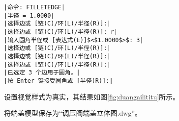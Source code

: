 \begin{procedure}
\begin{lstlisting}
|命令: FILLETEDGE|
|半径 = 1.0000|
|选择边或 [链(C)/环(L)/半径(R)]:|
|选择边或 [链(C)/环(L)/半径(R)]: r|
|输入圆角半径或 [表达式(E)]$<$1.0000$>$: 3|
|选择边或 [链(C)/环(L)/半径(R)]:|  
|选择边或 [链(C)/环(L)/半径(R)]:|
|选择边或 [链(C)/环(L)/半径(R)]:|
|已选定 3 个边用于圆角。|
|按 Enter 键接受圆角或 [半径(R)]:|
\end{lstlisting}
\item 设置视觉样式为真实，其结果如图\ref{fig:duangailititu}所示。
\item 将端盖模型保存为“调压阀端盖立体图.dwg”。
\end{procedure}
